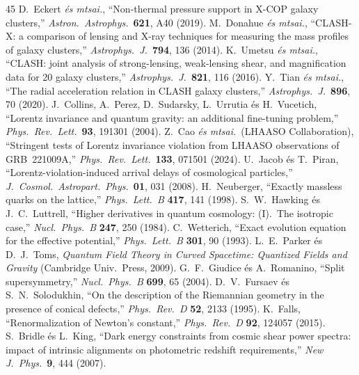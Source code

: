 \documentclass[11pt,a4paper]{article}
\begin{document}
\begin{thebibliography}{45}
 D.~Eckert \textit{és mtsai.}, ``Non-thermal pressure support in X-COP galaxy clusters,'' \textit{Astron.\ Astrophys.}\ \textbf{621}, A40 (2019).
 M.~Donahue \textit{és mtsai.}, ``CLASH-X: a comparison of lensing and X-ray techniques for measuring the mass profiles of galaxy clusters,'' \textit{Astrophys.\ J.}\ \textbf{794}, 136 (2014).
 K.~Umetsu \textit{és mtsai.}, ``CLASH: joint analysis of strong-lensing, weak-lensing shear, and magnification data for 20 galaxy clusters,'' \textit{Astrophys.\ J.}\ \textbf{821}, 116 (2016).
 Y.~Tian \textit{és mtsai.}, ``The radial acceleration relation in CLASH galaxy clusters,'' \textit{Astrophys.\ J.}\ \textbf{896}, 70 (2020).
 J.~Collins, A.~Perez, D.~Sudarsky, L.~Urrutia és H.~Vucetich, ``Lorentz invariance and quantum gravity: an additional fine-tuning problem,'' \textit{Phys.\ Rev.\ Lett.}\ \textbf{93}, 191301 (2004).
 Z.~Cao \textit{és mtsai.}\ (LHAASO Collaboration), ``Stringent tests of Lorentz invariance violation from LHAASO observations of GRB~221009A,'' \textit{Phys.\ Rev.\ Lett.}\ \textbf{133}, 071501 (2024).
 U.~Jacob és T.~Piran, ``Lorentz-violation-induced arrival delays of cosmological particles,'' \textit{J.\ Cosmol.\ Astropart.\ Phys.}\ \textbf{01}, 031 (2008).
 H.~Neuberger, ``Exactly massless quarks on the lattice,'' \textit{Phys.\ Lett.\ B} \textbf{417}, 141 (1998).
 S.~W.~Hawking és J.~C.~Luttrell, ``Higher derivatives in quantum cosmology: (I).\ The isotropic case,'' \textit{Nucl.\ Phys.\ B} \textbf{247}, 250 (1984).
 C.~Wetterich, ``Exact evolution equation for the effective potential,'' \textit{Phys.\ Lett.\ B} \textbf{301}, 90 (1993).
 L.~E.~Parker és D.~J.~Toms, \textit{Quantum Field Theory in Curved Spacetime: Quantized Fields and Gravity} (Cambridge Univ.\ Press, 2009).
 G.~F.~Giudice és A.~Romanino, ``Split supersymmetry,'' \textit{Nucl.\ Phys.\ B} \textbf{699}, 65 (2004).
 D.~V.~Fursaev és S.~N.~Solodukhin, ``On the description of the Riemannian geometry in the presence of conical defects,'' \textit{Phys.\ Rev.\ D} \textbf{52}, 2133 (1995).
 K.~Falls, ``Renormalization of Newton's constant,'' \textit{Phys.\ Rev.\ D} \textbf{92}, 124057 (2015).
 S.~Bridle és L.~King, ``Dark energy constraints from cosmic shear power spectra: impact of intrinsic alignments on photometric redshift requirements,'' \textit{New J.\ Phys.}\ \textbf{9}, 444 (2007).

\end{thebibliography}
\end{document}
